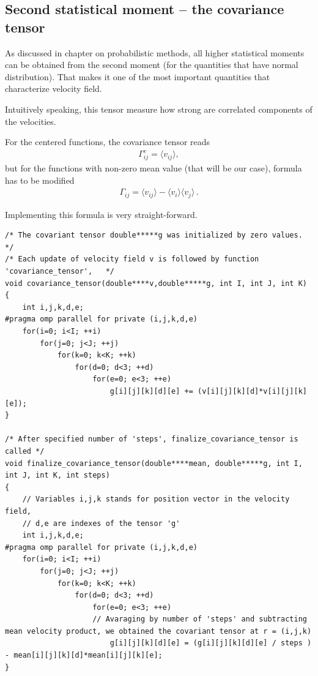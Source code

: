 \subsection{Second statistical moment -- the covariance tensor}
As discussed in chapter on probabilistic methods,
all higher statistical moments can be obtained from the second moment (for the quantities that have normal distribution).
That makes it one of the most important quantities that characterize velocity field.

Intuitively speaking, this tensor measure how strong are correlated components of the velocities.

\bigskip

For the centered functions, the covariance tensor reads
\begin{align}
\Gamma_{ij}^c = \langle v_{ij} \rangle,
\end{align}
but for the functions with non-zero mean value (that will be our case), formula has to be modified
\begin{align}
\Gamma_{ij} = \langle v_{ij} \rangle - \langle v_i \rangle \langle v_j \rangle \, .
\end{align}

Implementing this formula is very straight-forward.


\begin{lstlisting}
/* The covariant tensor double*****g was initialized by zero values. */
/* Each update of velocity field v is followed by function 'covariance_tensor',   */
void covariance_tensor(double****v,double*****g, int I, int J, int K)
{
	int i,j,k,d,e;
#pragma omp parallel for private (i,j,k,d,e)
	for(i=0; i<I; ++i)
		for(j=0; j<J; ++j)
			for(k=0; k<K; ++k)
				for(d=0; d<3; ++d)
					for(e=0; e<3; ++e)
						g[i][j][k][d][e] += (v[i][j][k][d]*v[i][j][k][e]);
}

/* After specified number of 'steps', finalize_covariance_tensor is called */
void finalize_covariance_tensor(double****mean, double*****g, int I, int J, int K, int steps)
{
	// Variables i,j,k stands for position vector in the velocity field,
	// d,e are indexes of the tensor 'g'
	int i,j,k,d,e;
#pragma omp parallel for private (i,j,k,d,e)
	for(i=0; i<I; ++i)
		for(j=0; j<J; ++j)
			for(k=0; k<K; ++k)
				for(d=0; d<3; ++d)
					for(e=0; e<3; ++e)
					// Avaraging by number of 'steps' and subtracting mean velocity product, we obtained the covariant tensor at r = (i,j,k)
						g[i][j][k][d][e] = (g[i][j][k][d][e] / steps ) - mean[i][j][k][d]*mean[i][j][k][e];
}

\end{lstlisting}

